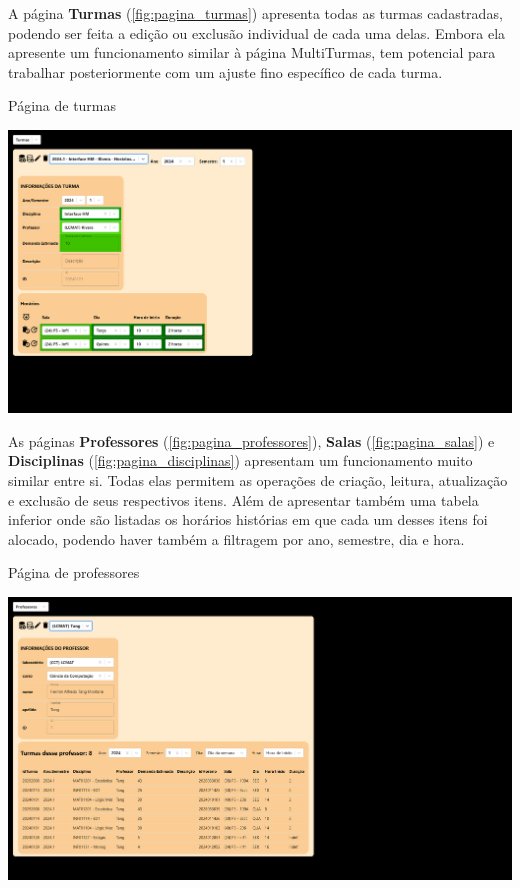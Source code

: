 A página \textbf{Turmas} (\autoref{fig:pagina_turmas}) apresenta todas as turmas cadastradas, podendo ser feita a edição ou exclusão individual de cada uma delas. Embora ela apresente um funcionamento similar à página MultiTurmas, tem potencial para trabalhar posteriormente com um ajuste fino específico de cada turma.

\begin{MyCenteredFigure} \caption{Página de turmas} \label{fig:pagina_turmas}
  \includegraphics[width=\textwidth]{files/img/2.02!7-resultados/6-Turmas.png}
\end{MyCenteredFigure}

As páginas \textbf{Professores} (\autoref{fig:pagina_professores}), \textbf{Salas} (\autoref{fig:pagina_salas}) e \textbf{Disciplinas} (\autoref{fig:pagina_disciplinas}) apresentam um funcionamento muito similar entre si. Todas elas permitem as operações de criação, leitura, atualização e exclusão de seus respectivos itens. Além de apresentar também uma tabela inferior onde são listadas os horários histórias em que cada um desses itens foi alocado, podendo haver também a filtragem por ano, semestre, dia e hora.

\begin{MyCenteredFigure} \caption{Página de professores} \label{fig:pagina_professores}
  \includegraphics[width=\textwidth]{files/img/2.02!7-resultados/7-Professores.png}
\end{MyCenteredFigure}

